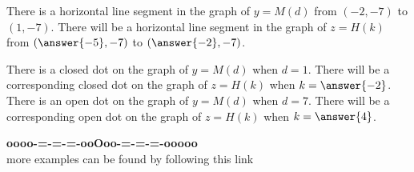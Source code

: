 \documentclass{ximera}
\begin{document}
\begin{example}
\begin{question}
\end{question}


\begin{question}

There is a horizontal line segment in the graph of $y = M(d)$ from $(-2, -7)$ to $(1, -7)$.  There will be a horizontal line segment in the graph of $z = H(k)$ from $\left(\answer{-5}, -7\right)$ to $\left(\answer{-2}, -7\right)$.

\end{question}



\begin{question}

There is a closed dot on the graph of $y= M(d)$  when $d = 1$.  There will be a corresponding closed dot on the graph of $z = H(k)$ when $k = \answer{-2}$. \\


There is an open dot on the graph of $y= M(d)$  when $d = 7$.  There will be a corresponding open dot on the graph of $z = H(k)$ when $k = \answer{4}$.

\end{question}




\end{example}


























\begin{center}
\textbf{\textcolor{green!50!black}{oooo-=-=-=-ooOoo-=-=-=-ooooo}} \\

more examples can be found by following this link\\ 

\end{center}
\end{document}
